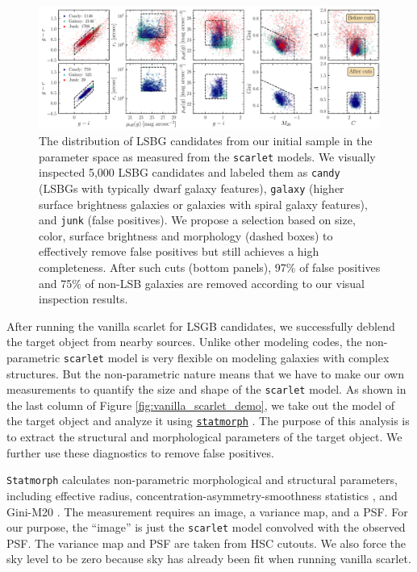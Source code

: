 \documentclass[twocolumn,astrosymb,twocolappendix]{aastex631}
\newcommand{\code}[1]{\texttt{#1}}
\begin{document}
\begin{CJK*}{UTF8}{gbsn}
\begin{figure}
	\vbox{
		\centering
		\includegraphics[width=1.0\linewidth]{deblending_cuts.pdf}
	}
	\caption{The distribution of LSBG candidates from our initial sample in the parameter space as measured from the \code{scarlet} models. We visually inspected 5,000 LSBG candidates and labeled them as \code{candy} (LSBGs with typically dwarf galaxy features), \code{galaxy} (higher surface brightness galaxies or galaxies with spiral galaxy features), and \code{junk} (false positives). We propose a selection based on size, color, surface brightness and morphology (dashed boxes) to effectively remove false positives but still achieves a high completeness. After such cuts (bottom panels), 97\% of false positives and 75\% of non-LSB galaxies are removed according to our visual inspection results. 
	}
	\label{fig:deblending_cuts}
\end{figure}

After running the vanilla scarlet for LSGB candidates, we successfully deblend the target object from nearby sources. Unlike other modeling codes, the non-parametric \code{scarlet} model is very flexible on modeling galaxies with complex structures. But the non-parametric nature means that we have to make our own measurements to quantify the size and shape of the \code{scarlet} model. As shown in the last column of Figure \ref{fig:vanilla_scarlet_demo}, we take out the model of the target object and analyze it using \href{https://statmorph.readthedocs.io/en/latest/}{\code{statmorph}} \citep{statmorph}. The purpose of this analysis is to extract the structural and morphological parameters of the target object. We further use these diagnostics to remove false positives. 

\code{Statmorph} calculates non-parametric morphological and structural parameters, including effective radius, concentration-asymmetry-smoothness statistics \citep[CAS,][]{Conselice2003}, and Gini-M20 \citep{Abraham2003,Lotz2004}. The measurement requires an image, a variance map, and a PSF. For our purpose, the ``image'' is just the \code{scarlet} model convolved with the observed PSF. The variance map and PSF are taken from HSC cutouts. We also force the sky level to be zero because sky has already been fit when running vanilla scarlet. 


\end{CJK*}
\end{document}
